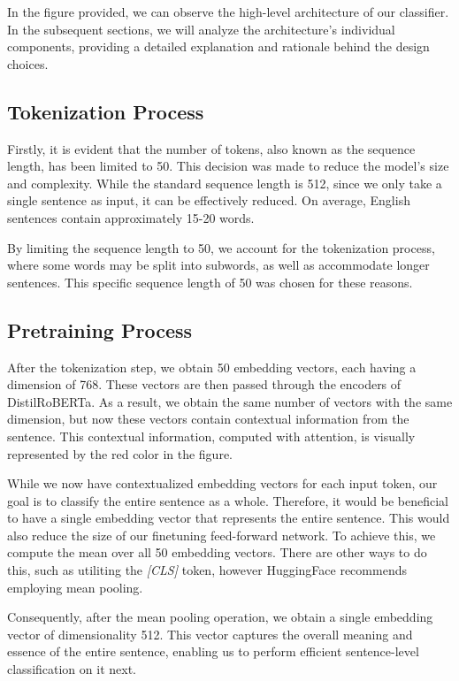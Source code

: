 \documentclass[a4paper,12pt]{report} %
\begin{document}
In the figure provided, we can observe the high-level architecture of our classifier. In the subsequent sections, we will analyze the architecture's individual components, providing a detailed explanation and rationale behind the design choices.

\subsection{Tokenization Process}
Firstly, it is evident that the number of tokens, also known as the sequence length, has been limited to 50. This decision was made to reduce the model's size and complexity. While the standard sequence length is 512, since we only take a single sentence as input, it can be effectively reduced. On average, English sentences contain approximately 15-20 words.

By limiting the sequence length to 50, we account for the tokenization process, where some words may be split into subwords, as well as accommodate longer sentences. This specific sequence length of 50 was chosen for these reasons.

\subsection{Pretraining Process}
After the tokenization step, we obtain 50 embedding vectors, each having a dimension of 768. These vectors are then passed through the encoders of DistilRoBERTa. As a result, we obtain the same number of vectors with the same dimension, but now these vectors contain contextual information from the sentence. This contextual information, computed with attention, is visually represented by the red color in the figure.

While we now have contextualized embedding vectors for each input token, our goal is to classify the entire sentence as a whole. Therefore, it would be beneficial to have a single embedding vector that represents the entire sentence. This would also reduce the size of our finetuning feed-forward network. To achieve this, we compute the mean over all 50 embedding vectors. There are other ways to do this, such as utiliting the \textit{[CLS]} token, however HuggingFace recommends employing mean pooling. %

Consequently, after the mean pooling operation, we obtain a single embedding vector of dimensionality 512. This vector captures the overall meaning and essence of the entire sentence, enabling us to perform efficient sentence-level classification on it next.
\end{document}
